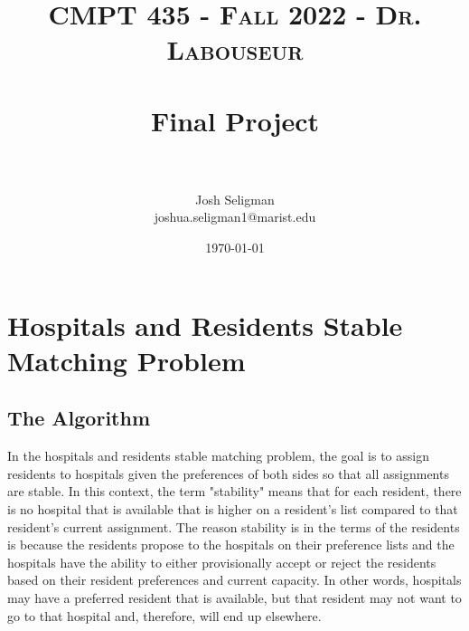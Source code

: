 \documentclass[letterpaper, 10pt,DIV=13]{scrartcl}
\title{	
   \normalfont \normalsize 
   \textsc{CMPT 435 - Fall 2022 - Dr. Labouseur} \\[10pt] %
   \horrule{0.5pt} \\[0.25cm] 	%
   \huge Final Project  \\     	    %
   \horrule{0.5pt} \\[0.25cm] 	%
}
\author{Josh Seligman \\ \normalsize joshua.seligman1@marist.edu}
\date{\normalsize\today} 	%
\numberwithin{equation}{section} %
\numberwithin{figure}{section} %
\numberwithin{table}{section} %
\begin{document}
\maketitle %

\section{Hospitals and Residents Stable Matching Problem}
\subsection{The Algorithm}
In the hospitals and residents stable matching problem, the goal is to assign residents to hospitals given the preferences of both sides so that all assignments are stable. In this context, the term "stability" means that for each resident, there is no hospital that is available that is higher on a resident's list compared to that resident's current assignment. The reason stability is in the terms of the residents is because the residents propose to the hospitals on their preference lists and the hospitals have the ability to either provisionally accept or reject the residents based on their resident preferences and current capacity. In other words, hospitals may have a preferred resident that is available, but that resident may not want to go to that hospital and, therefore, will end up elsewhere.
\end{document}
